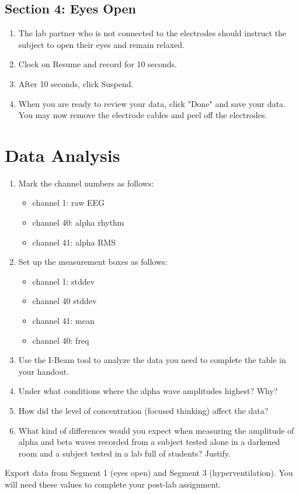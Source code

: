 \documentclass{article}
\begin{document}
\subsection*{Section 4: Eyes Open}
\begin{enumerate}
	\item The lab partner who is not connected to the electrodes should instruct the subject to open their eyes and remain relaxed.
	\item Clock on Resume and record for 10 seconds.
	\item After 10 seconds, click Suspend.
	\item When you are ready to review your data, click "Done" and save your data. You may now remove the electrode cables and peel off the electrodes.
\end{enumerate}

\section*{Data Analysis}
\begin{enumerate}
	\item Mark the channel numbers as follows:\begin{itemize}
		\item channel 1: raw EEG
		\item channel 40: alpha rhythm
		\item channel 41: alpha RMS
	\end{itemize}
	
	\item Set up the measurement boxes as follows:\begin{itemize}
		\item channel 1: stddev
		\item channel 40 stddev
		\item channel 41: mean
		\item channel 40: freq
	\end{itemize}
	
	\item Use the I-Beam tool to analyze the data you need to complete the table in your handout.
	\item Under what conditions where the alpha wave amplitudes highest? Why?
	\item How did the level of concentration (focused thinking) affect the data?
	\item What kind of differences would you expect when measuring the amplitude of alpha and beta waves recorded from a subject tested alone in a darkened room and a subject tested in a lab full of students? Justify.
\end{enumerate}

\begin{info}
	Export data from Segment 1 (eyes open) and Segment 3 (hyperventilation). You will need these values to complete your post-lab assignment.
\end{info}
\end{document}

